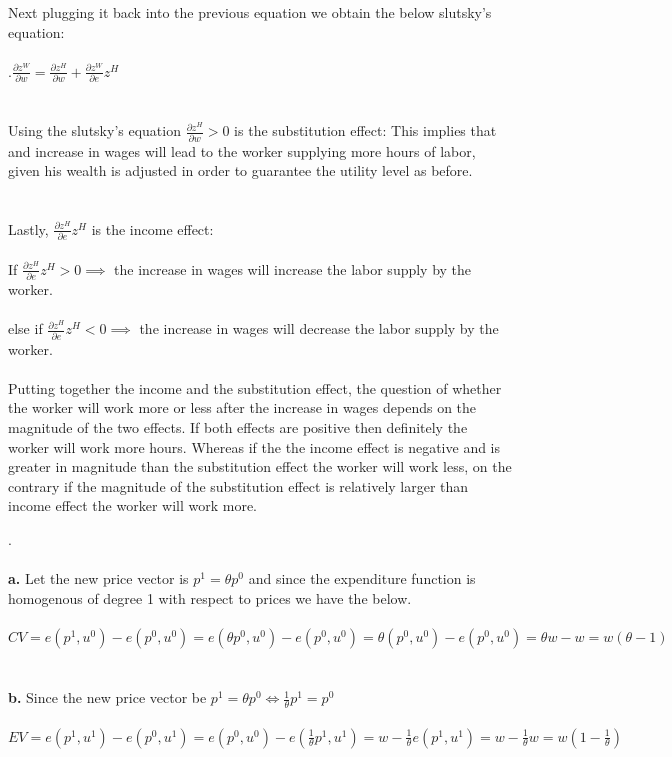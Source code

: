 \documentclass[12pt]{article}
\newenvironment{problem}[2][Problem]{\begin{trivlist}
\item[\hskip \labelsep {\bfseries #1}\hskip \labelsep {\bfseries #2.}]}{\end{trivlist}}
\newcommand\ddfrac[2]{\frac{\displaystyle #1}{\displaystyle #2}}
\begin{document}
\begin{problem}{1}
Next plugging it back into the previous equation we obtain the below slutsky's equation: 
\\
\\
.\hspace{50mm}$  \ddfrac{\partial z^W}{\partial w} =  \ddfrac{\partial z^H}{\partial w} + \ddfrac{\partial z^W}{\partial e} z^H $
\\
\\
\\
Using the slutsky's equation  $\ddfrac{\partial z^H}{\partial w} > 0$ is the substitution effect: This implies that and increase in wages will lead to the worker supplying more hours of labor, given his wealth is adjusted in order to guarantee the utility level as before.\\
\\
\\
Lastly, $\ddfrac{\partial z^H}{\partial e} z^H$ is the income effect: 
\\
\\
If $\ddfrac{\partial z^H}{\partial e} z^H > 0 \implies$ the increase in wages will increase the labor supply by the worker.
\\
\\
else if $\ddfrac{\partial z^H}{\partial e} z^H < 0\implies$ the increase in wages will decrease the labor supply by the worker.
\\
\\
Putting together the income and the substitution effect, the question of whether the worker will work more or less after the increase in wages depends on the magnitude of the two effects. If both effects are positive then definitely the worker will work more hours. Whereas if the the income effect is negative and is greater in magnitude than the substitution effect the worker will work less, on the contrary if the magnitude of the substitution effect is relatively larger than income effect the worker will work more. 
\\
\end{problem}
\begin{problem}{2}. \\ \\
\textbf{a.} Let the new price vector is $p^1 = \theta p^0 $ and since the expenditure function is homogenous of degree 1 with respect to prices we have the below.
\\
\\
$CV = e(p^1, u^0) - e( p^0, u^0) = e(\theta p^0, u^0) - e( p^0, u^0) = \theta (p^0, u^0) - e( p^0, u^0) = \theta w - w = w (\theta - 1) $
\\
\\
\\
\textbf{b.} Since the new price vector be $p^1 = \theta p^0 \iff \frac{1}{\theta} p^1 = p^0$
\\
\\
$EV = e(p^1, u^1) - e( p^0, u^1) = e(p^0, u^0) - e( \frac{1}{\theta} p^1, u^1) = w- \frac{1}{\theta} e( p^1, u^1) =  w - \frac{1}{\theta} w = w (1 - \frac{1}{\theta})$
\\
\\
\end{problem}
\end{document}
